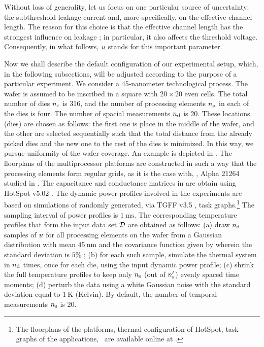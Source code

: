 Without loss of generality, let us focus on one particular source of uncertainty: the subthreshold leakage current and, more specifically, on the effective channel length.
The reason for this choice is that the effective channel length has the strongest influence on leakage \cite{juan2011, juan2012}; in particular, it also affects the threshold voltage. Consequently, in what follows, $u$ stands for this important parameter.



Now we shall describe the default configuration of our experimental setup, which, in the following subsections, will be adjusted according to the purpose of a particular experiment.
We consider a 45-nanometer technological process. The wafer is assumed to be inscribed in a square with $20 \times 20$ even cells. The total number of dies ${n_{\text{c}}}$ is 316, and the number of processing elements ${n_\text{p}}$ in each of the dies is four.
The number of spacial measurements ${n_{\text{d}}}$ is 20. These locations (dies) are chosen as follows: the first one is place in the middle of the wafer, and the other are selected sequentially such that the total distance from the already picked dies and the new one to the rest of the dies is minimized. In this way, we pursue uniformity of the wafer coverage. An example is depicted in .
The floorplans of the multiprocessor platforms are constructed in such a way that the processing elements form regular grids, as it is the case with, \eg, Alpha 21264 studied in \cite{juan2011}. The capacitance and conductance matrices in  are obtain using HotSpot v5.02 \cite{hotspot}.
The dynamic power profiles involved in the experiments are based on simulations of randomly generated, via TGFF v3.5 \cite{dick1998}, task graphs.\footnote{The floorplans of the platforms, thermal configuration of HotSpot, task graphs of the applications, \etc\ are available online at \cite{sources}.} The sampling interval of power profiles is $1~\text{ms}$.
The corresponding temperature profiles that form the input data set $\mathcal{D}$ are obtained as follows: (a) draw ${n_{\text{d}}}$ samples of $u$ for all processing elements on the wafer from a Gaussian distribution with mean $45~\text{nm}$ and the covariance function given by  wherein the standard deviation is $5\%$ \cite{juan2011, juan2012}; (b) for each such sample, simulate the thermal system in  ${n_{\text{d}}}$ times, once for each die, using the input dynamic power profile; (c) shrink the full temperature profiles to keep only ${n_\text{s}}$ (out of ${n_\text{s}'}$) evenly spaced time moments; (d) perturb the data using a white Gaussian noise with the standard deviation equal to $1~\text{K}$ (Kelvin). By default, the number of temporal measurements ${n_\text{s}}$ is 20.

